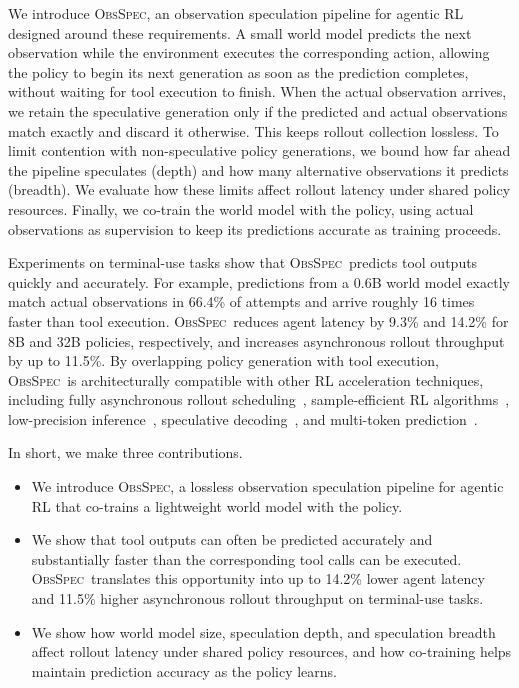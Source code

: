 \documentclass{article} %
\newcommand{\method}{\textsc{ObsSpec}}
\begin{document}
We introduce \method, an observation speculation pipeline for agentic RL designed around these requirements. A small world model predicts the next observation while the environment executes the corresponding action, allowing the policy to begin its next generation as soon as the prediction completes, without waiting for tool execution to finish. When the actual observation arrives, we retain the speculative generation only if the predicted and actual observations match exactly and discard it otherwise. This keeps rollout collection lossless. To limit contention with non-speculative policy generations, we bound how far ahead the pipeline speculates (depth) and how many alternative observations it predicts (breadth). We evaluate how these limits affect rollout latency under shared policy resources. Finally, we co-train the world model with the policy, using actual observations as supervision to keep its predictions accurate as training proceeds.

Experiments on terminal-use tasks show that \method\ predicts tool outputs quickly and accurately. For example, predictions from a 0.6B world model exactly match actual observations in 66.4\% of attempts and arrive roughly 16 times faster than tool execution. \method\ reduces agent latency by 9.3\% and 14.2\% for 8B and 32B policies, respectively, and increases asynchronous rollout throughput by up to 11.5\%. By overlapping policy generation with tool execution, \method\ is architecturally compatible with other RL acceleration techniques, including fully asynchronous rollout scheduling~\citep{fu2026areal,piche2025pipelinerl}, sample-efficient RL algorithms~\citep{chen2025minimax,gao2025soft, shrivastava2026echo}, low-precision inference~\citep{xiao2023smoothquant,qiu2026fp8}, speculative decoding~\citep{leviathan2023fast,chen2026respec,pham2026specroll}, and multi-token prediction~\citep{gloeckle2024better,wang2026mtp}.

In short, we make three contributions.
\begingroup
\setlength{\leftmargini}{1.5em}
\begin{itemize}
    \item We introduce \method, a lossless observation speculation pipeline for agentic RL that co-trains a lightweight world model with the policy.
    \item We show that tool outputs can often be predicted accurately and substantially faster than the corresponding tool calls can be executed. \method\ translates this opportunity into up to 14.2\% lower agent latency and 11.5\% higher asynchronous rollout throughput on terminal-use tasks.
    \item We show how world model size, speculation depth, and speculation breadth affect rollout latency under shared policy resources, and how co-training helps maintain prediction accuracy as the policy learns.
\end{itemize}
\endgroup
\end{document}
